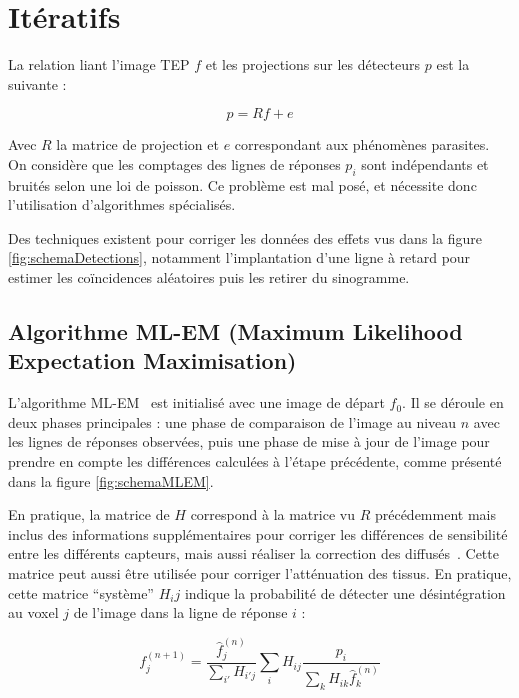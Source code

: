 	\section{Itératifs}

La relation liant l'image TEP $f$ et les projections sur les détecteurs $p$ est la suivante :

\begin{equation}
	p = R f + e
\end{equation}

Avec $R$ la matrice de projection et $e$ correspondant aux phénomènes parasites. On considère que les comptages des lignes de réponses $p_i$ sont indépendants et bruités selon une loi de poisson. Ce problème est mal posé, et nécessite donc l'utilisation d'algorithmes spécialisés. 

Des techniques existent pour corriger les données des effets vus dans la figure \ref{fig:schemaDetections}, notamment l'implantation d'une ligne à retard pour estimer les coïncidences aléatoires puis les retirer du sinogramme.

		\subsection{Algorithme ML-EM (Maximum Likelihood Expectation Maximisation) }


L'algorithme ML-EM~\cite{shepp1982maximum} est initialisé avec une image de départ $f_0$. Il se déroule en deux phases principales : une phase de comparaison de l'image au niveau $n$ avec les lignes de réponses observées, puis une phase de mise à jour de l'image pour prendre en compte les différences calculées à l'étape précédente, comme présenté dans la figure \ref{fig:schemaMLEM}.

En pratique, la matrice de $H$ correspond à la matrice vu $R$ précédemment mais inclus des informations supplémentaires pour corriger les différences de sensibilité entre les différents capteurs, mais aussi réaliser la correction des diffusés~\cite{shepp1982maximum,chornoboy1990evaluation}. Cette matrice peut aussi être utilisée pour corriger l'atténuation des tissus. En pratique, cette matrice ``système'' $H_ij$ indique la probabilité de détecter une désintégration au voxel $j$ de l'image dans la ligne de réponse $i$ :

\begin{equation}
	f_j^{(n+1)}=\frac{\hat{f}_j^{(n)}}{\sum\limits_{i'}H_{i'j}}\sum\limits_{i}H_{ij}\frac{p_i}{\sum\limits_{k}H_{ik}\hat{f}_k^{(n)}}
\label{eq:MLEM}
\end{equation}


